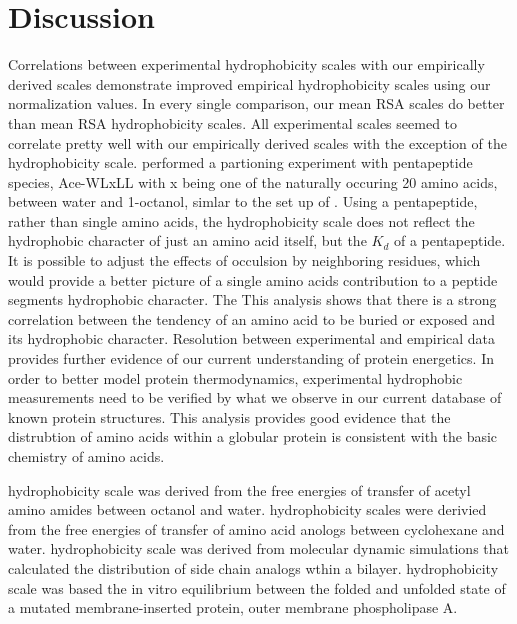 \documentclass[12pt]{article}
\begin{document}
\section{Discussion}
Correlations between experimental hydrophobicity scales with our empirically derived scales demonstrate improved empirical hydrophobicity scales using our normalization values. In every single comparison, our mean RSA scales do better than \cite{Rose1985} mean RSA hydrophobicity scales. All experimental scales seemed to correlate pretty well with our empirically derived scales with the exception of the \cite{Wimley} hydrophobicity scale. \cite{Wimley} performed a partioning experiment with pentapeptide species, Ace-WLxLL with x being one of the naturally occuring 20 amino acids, between water and 1-octanol, simlar to the set up of \cite{Fauchere1983}. Using a pentapeptide, rather than single amino acids, the \cite{Wimley} hydrophobicity scale does not reflect the hydrophobic character of just an amino acid itself, but the $K_d$ of a pentapeptide. It is possible to adjust the effects of occulsion by neighboring residues, which would provide a better picture of a single amino acids contribution to a peptide segments hydrophobic character. 
The 
This analysis shows that there is a strong correlation between the tendency of an amino acid to be buried or exposed and its hydrophobic character. Resolution between experimental and empirical data provides further evidence of our current understanding of protein energetics. In order to better model protein thermodynamics, experimental hydrophobic measurements need to be verified by what we observe in our current database of known protein structures. This analysis provides good evidence that the distrubtion of amino acids within a globular protein is consistent with the basic chemistry of amino acids. 


\cite{Fauchere1983} hydrophobicity scale was derived from the free energies of transfer of acetyl amino amides between octanol and water. \cite{Radzicka1988} hydrophobicity scales were derivied from the free energies of transfer of amino acid anologs between cyclohexane and water. \cite{MacCallum2007} hydrophobicity scale was derived from molecular dynamic simulations that calculated the distribution of \cite{Radzicka1983} side chain analogs wthin a bilayer. \cite{Moon2011} hydrophobicity scale was based the in vitro equilibrium between the folded and unfolded state of a mutated membrane-inserted protein, outer membrane phospholipase A. 



\end{document}
